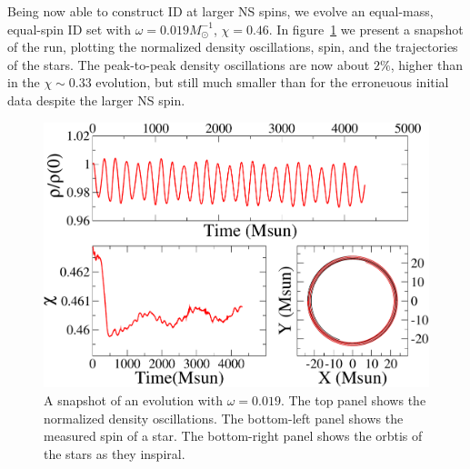 \begin{subappendices}
Being now able to construct ID at larger NS spins, we evolve 
an equal-mass, equal-spin ID
set with $\omega=0.019M_{\odot}^{-1}$, $\chi=0.46$. In
figure~\ref{fig:Ev1Snapshot} we present a snapshot of the run,
plotting the normalized density oscillations, spin, and the
trajectories of the stars. The peak-to-peak density oscillations are now about
$2\%$, higher than in the $\chi\sim0.33$ evolution, but still much
smaller than for the erroneuous initial data despite the larger NS spin.
\begin{figure}
\includegraphics[width=0.95\columnwidth]{chap2/Ev1Snapshot}
\caption[Snapshot of a high-spin evolution using corrected initial data.]{\label{fig:Ev1Snapshot} A snapshot of an evolution with
  $\omega=0.019$. The top panel shows the normalized density
  oscillations. The bottom-left panel shows the measured spin of a
  star. The bottom-right panel shows the orbtis of the stars as they
  inspiral.}
\end{figure}
\end{subappendices}
